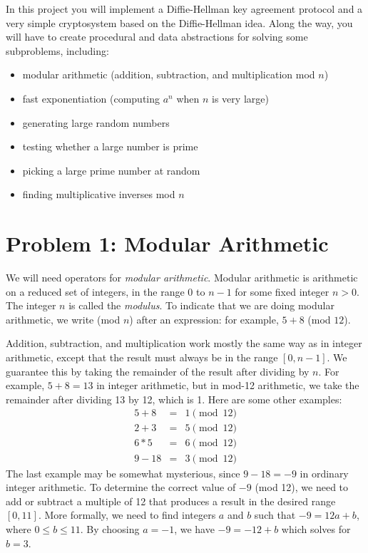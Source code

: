 In this project you will implement a Diffie-Hellman key agreement
protocol and a very simple cryptosystem based on the Diffie-Hellman
idea.  Along the way, you will have to create procedural and data
abstractions for solving some subproblems, including:
\begin{itemize}
\item modular arithmetic (addition, subtraction, and multiplication mod $n$)
\item fast exponentiation (computing $a^n$ when $n$ is very large)
\item generating large random numbers
\item testing whether a large number is prime
\item picking a large prime number at random
\item finding multiplicative inverses mod $n$
\end{itemize}

\section*{Problem 1: Modular Arithmetic}

We will need operators for {\em modular arithmetic}.
Modular arithmetic is arithmetic on a reduced set of integers, in the
range $0$ to $n-1$ for some fixed integer $n > 0$.  The integer $n$ is
called the {\it modulus}.  To indicate that we are doing modular
arithmetic, we write (mod $n$) after an expression: for example, $5+8$
(mod $12$).

Addition, subtraction, and multiplication work mostly the same way as
in integer arithmetic, except that the result must always be in the
range $[0,n-1]$.  We guarantee this by taking the remainder of the
result after dividing by $n$.  For example, $5+8=13$ in integer
arithmetic, but in mod-12 arithmetic, we take the remainder after
dividing 13 by 12, which is 1.  Here are some other examples:
\begin{eqnarray*}
5 + 8 & = & 1 \pmod{12}\\
2 + 3 & = & 5 \pmod{12}\\
6 * 5 & = & 6 \pmod{12}\\
9 - 18 & = & 3 \pmod{12}
\end{eqnarray*}
The last example may be somewhat mysterious, since $9-18=-9$ in
ordinary integer arithmetic.  To determine the correct value of
$-9$ (mod 12), we need to add or subtract a multiple of 12 that
produces a result in the desired range $[0,11]$.  More formally, we
need to find integers $a$ and $b$ such that $-9 = 12a + b$, where $0
\leq b \leq 11$.  By choosing $a = -1$, we have $-9 = -12 + b$ which
solves for $b = 3$.

